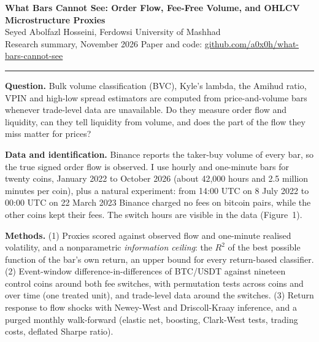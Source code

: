 \documentclass[10pt]{article}
\begin{document}
{\Large\bfseries What Bars Cannot See: Order Flow, Fee-Free Volume, and OHLCV Microstructure Proxies}\\[3pt]
Seyed Abolfazl Hosseini, Ferdowsi University of Mashhad\\
Research summary, November 2026 \hfill Paper and code: \href{https://github.com/a0x0h/what-bars-cannot-see}{github.com/a0x0h/what-bars-cannot-see}

\vspace{3pt}\hrule\vspace{5pt}

\textbf{Question.} Bulk volume classification (BVC), Kyle's lambda, the Amihud ratio, VPIN and
high-low spread estimators are computed from price-and-volume bars whenever trade-level data are
unavailable. Do they measure order flow and liquidity, can they tell liquidity from volume, and does
the part of the flow they miss matter for prices?

\textbf{Data and identification.} Binance reports the taker-buy volume of every bar, so the true
signed order flow is observed. I use hourly and one-minute bars for twenty coins, January 2022 to
October 2026 (about 42{,}000 hours and 2.5 million minutes per coin), plus a natural experiment:
from 14:00 UTC on 8 July 2022 to 00:00 UTC on 22 March 2023 Binance charged no fees on bitcoin pairs,
while the other coins kept their fees. The switch hours are visible in the data (Figure~1).

\textbf{Methods.} (1) Proxies scored against observed flow and one-minute realised volatility, and a
nonparametric \emph{information ceiling}: the $R^2$ of the best possible function of the bar's own
return, an upper bound for every return-based classifier. (2) Event-window difference-in-differences
of BTC/USDT against nineteen control coins around both fee switches, with permutation tests across
coins and over time (one treated unit), and trade-level data around the switches. (3) Return
response to flow shocks with Newey-West and Driscoll-Kraay inference, and a purged monthly
walk-forward (elastic net, boosting, Clark-West tests, trading costs, deflated Sharpe ratio).
\end{document}
